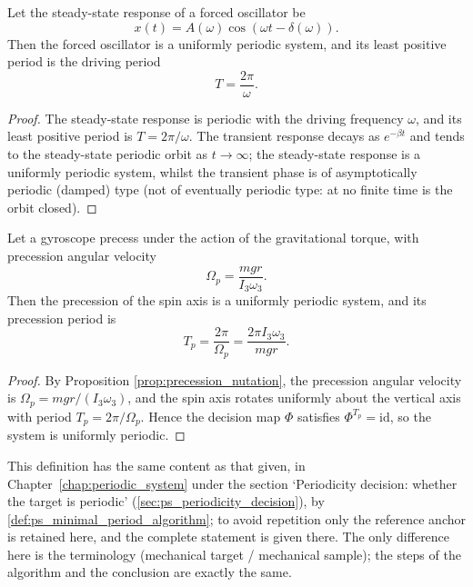 \begin{lemma}\label{lem:forced_periodic}
Let the steady-state response of a forced oscillator be
\[
x(t)=A(\omega)\cos(\omega t-\delta(\omega)).
\]
Then the forced oscillator is a uniformly periodic system, and its least positive period is the driving period
\[
T=\frac{2\pi}{\omega}.
\]
\end{lemma}

\begin{proof}
The steady-state response is periodic with the driving frequency $\omega$, and its least positive period is $T=2\pi/\omega$. The transient response decays as $e^{-\beta t}$ and tends to the steady-state periodic orbit as $t\to\infty$; the steady-state response is a uniformly periodic system, whilst the transient phase is of asymptotically periodic (damped) type (not of eventually periodic type: at no finite time is the orbit closed).
\end{proof}

\begin{lemma}\label{lem:gyroscope_periodic}
Let a gyroscope precess under the action of the gravitational torque, with precession angular velocity
\[
\Omega_p=\frac{mgr}{I_3\omega_3}.
\]
Then the precession of the spin axis is a uniformly periodic system, and its precession period is
\[
T_p=\frac{2\pi}{\Omega_p}=\frac{2\pi I_3\omega_3}{mgr}.
\]
\end{lemma}

\begin{proof}
By Proposition \ref{prop:precession_nutation}, the precession angular velocity is $\Omega_p=mgr/(I_3\omega_3)$, and the spin axis rotates uniformly about the vertical axis with period $T_p=2\pi/\Omega_p$. Hence the decision map $\Phi$ satisfies $\Phi^{T_p}=\mathrm{id}$, so the system is uniformly periodic.
\end{proof}

\begin{definition}\label{def:mech_minimal_period_algorithm}
This definition has the same content as that given, in Chapter~\ref{chap:periodic_system} under the section `Periodicity decision: whether the target is periodic' (\cref{sec:ps_periodicity_decision}), by \cref{def:ps_minimal_period_algorithm}; to avoid repetition only the reference anchor is retained here, and the complete statement is given there. The only difference here is the terminology (mechanical target / mechanical sample); the steps of the algorithm and the conclusion are exactly the same.
\end{definition}

